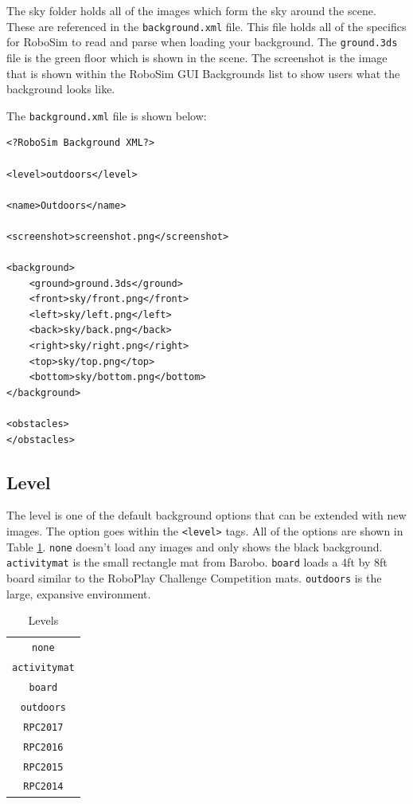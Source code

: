 \documentclass{article}
\begin{document}
The sky folder holds all of the images which form the sky around the scene.
These are referenced in the \texttt{background.xml} file.  This file holds all
of the specifics for RoboSim to read and parse when loading your background.
The \texttt{ground.3ds} file is the green floor which is shown in the scene.
The screenshot is the image that is shown within the RoboSim GUI Backgrounds
list to show users what the background looks like.

The \texttt{background.xml} file is shown below:
\begin{verbatim}
<?RoboSim Background XML?>

<level>outdoors</level>

<name>Outdoors</name>

<screenshot>screenshot.png</screenshot>

<background>
    <ground>ground.3ds</ground>
    <front>sky/front.png</front>
    <left>sky/left.png</left>
    <back>sky/back.png</back>
    <right>sky/right.png</right>
    <top>sky/top.png</top>
    <bottom>sky/bottom.png</bottom>
</background>

<obstacles>
</obstacles>
\end{verbatim}

\subsection{Level}
The level is one of the default background options that can be extended with new
images.  The option goes within the \texttt{<level>} tags.  All of the options
are shown in Table \ref{tab:levels}.  \texttt{none} doesn't load any images and
only shows the black background.  \texttt{activitymat} is the small rectangle
mat from Barobo.  \texttt{board} loads a 4ft by 8ft board similar to the
RoboPlay Challenge Competition mats. \texttt{outdoors} is the large, expansive
environment.

\begin{table}[H]
	\begin{center}
	\begin{tabular}{c}
		\hline \hline
		\verb|none| \\
		\verb|activitymat| \\
		\verb|board| \\
		\verb|outdoors| \\
		\verb|RPC2017| \\
		\verb|RPC2016| \\
		\verb|RPC2015| \\
		\verb|RPC2014| \\
		\hline \hline
	\end{tabular}
	\caption{Levels}
	\label{tab:levels}
	\end{center}
\end{table}
\end{document}
